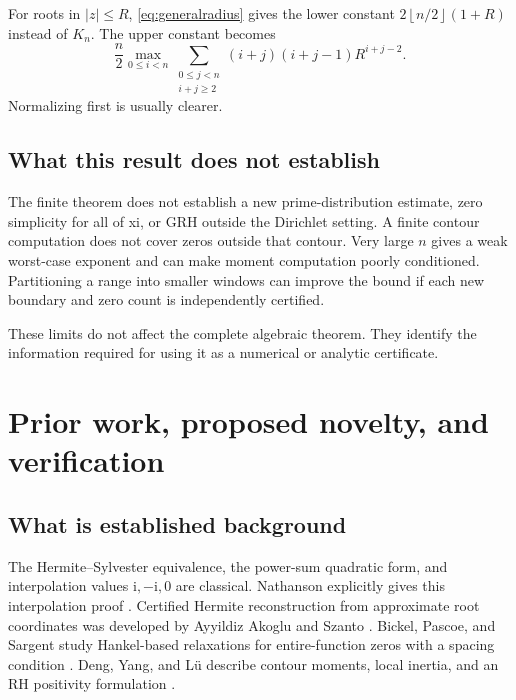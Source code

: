 \documentclass[11pt]{article}
\theoremstyle{definition}
\newcommand{\I}{\mathrm i}
\newcommand{\floor}[1]{\left\lfloor#1\right\rfloor}
\begin{document}
For roots in $|z|\leq R$, \eqref{eq:generalradius} gives the lower
constant $2\floor{n/2}(1+R)$ instead of $K_n$. The upper constant becomes
\[
 \frac n2\max_{0\leq i<n}
 \sum_{\substack{0\leq j<n\\i+j\geq2}}
 (i+j)(i+j-1)R^{i+j-2}.
\]
Normalizing first is usually clearer.

\subsection{What this result does not establish}

The finite theorem does not establish a new prime-distribution estimate,
zero simplicity for all of xi, or GRH outside the Dirichlet setting. A finite
contour computation does not cover zeros outside that contour. Very large
$n$ gives a weak worst-case exponent and can make moment computation poorly
conditioned. Partitioning a range into smaller windows can improve the
bound if each new boundary and zero count is independently certified.

These limits do not affect the complete algebraic theorem. They identify
the information required for using it as a numerical or analytic certificate.

\section{Prior work, proposed novelty, and verification}

\subsection{What is established background}

The Hermite--Sylvester equivalence, the power-sum quadratic form, and
interpolation values $\I,-\I,0$ are classical. Nathanson explicitly gives
this interpolation proof \cite{nathanson}. Certified Hermite reconstruction
from approximate root coordinates was developed by Ayyildiz Akoglu and
Szanto \cite{akoglu,macis}. Bickel, Pascoe, and Sargent study Hankel-based
relaxations for entire-function zeros with a spacing condition
\cite{bickel}. Deng, Yang, and L\"u describe contour moments, local inertia,
and an RH positivity formulation \cite{deng}.
\end{document}
